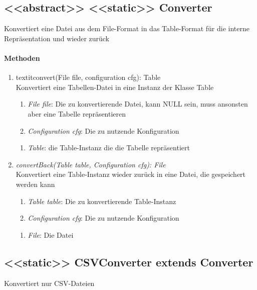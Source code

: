 \subsection{<<abstract>> <<static>> Converter}
Konvertiert eine Datei aus dem File-Format in das Table-Format für die interne Repräsentation und wieder zurück \\

\paragraph{Methoden}
\begin{enumerate}[+]
	\item textit{convert(File file, configuration cfg): Table} \\
	Konvertiert eine Tabellen-Datei in eine Instanz der Klasse Table
	
	\begin{enumerate}[$\bullet$]
		\item \textit{File file}: Die zu konvertierende Datei, kann NULL sein, muss ansonsten aber eine Tabelle repräsentieren
		\item \textit{Configuration cfg}: Die zu nutzende Konfiguration
	\end{enumerate}
	\vspace{-0.2cm}
	\begin{enumerate}[$\circ$]
		\item \textit{Table}: die Table-Instanz die die Tabelle repräsentiert
	\end{enumerate}

	\item \textit{convertBack(Table table, Configuration cfg): File} \\
	Konvertiert eine Table-Instanz wieder zurück in eine Datei, die gespeichert werden kann
	\begin{enumerate}[$\bullet$]
		\item \textit{Table table}: Die zu konvertierende Table-Instanz
		\item \textit{Configuration cfg}: Die zu nutzende Konfiguration
	\end{enumerate}
	\vspace{-0.2cm}
	\begin{enumerate}[$\circ$]
		\item \textit{File}: Die Datei
	\end{enumerate}
\end{enumerate}


\subsection{<<static>> CSVConverter extends Converter}
Konvertiert nur CSV-Dateien \\

